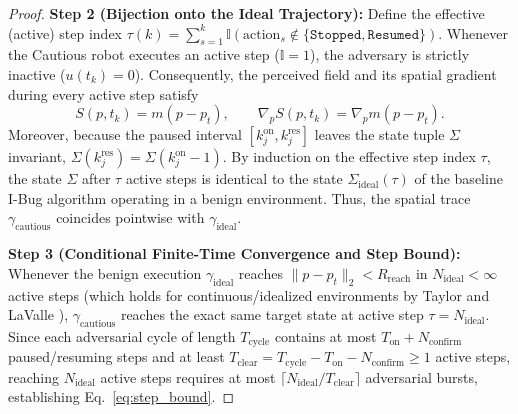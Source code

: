 \documentclass[12pt, a4paper]{article}
\begin{document}
\begin{proof}
\textbf{Step 2 (Bijection onto the Ideal Trajectory):}
Define the effective (active) step index $\tau(k) = \sum_{s=1}^k \mathbb{I}(\text{action}_s \notin \{\texttt{Stopped}, \texttt{Resumed}\})$. Whenever the Cautious robot executes an active step ($\mathbb{I} = 1$), the adversary is strictly inactive ($u(t_k) = 0$). Consequently, the perceived field and its spatial gradient during every active step satisfy
\begin{equation*}
    S(p, t_k) = m(p - p_t), \qquad \nabla_p S(p, t_k) = \nabla_p m(p - p_t).
\end{equation*}
Moreover, because the paused interval $[k_j^{\text{on}}, k_j^{\text{res}}]$ leaves the state tuple $\Sigma$ invariant, $\Sigma(k_j^{\text{res}}) = \Sigma(k_j^{\text{on}} - 1)$. By induction on the effective step index $\tau$, the state $\Sigma$ after $\tau$ active steps is identical to the state $\Sigma_{\text{ideal}}(\tau)$ of the baseline I-Bug algorithm operating in a benign environment. Thus, the spatial trace $\gamma_{\text{cautious}}$ coincides pointwise with $\gamma_{\text{ideal}}$.

\textbf{Step 3 (Conditional Finite-Time Convergence and Step Bound):}
Whenever the benign execution $\gamma_{\text{ideal}}$ reaches $\|p - p_t\|_2 < R_{\text{reach}}$ in $N_{\text{ideal}} < \infty$ active steps (which holds for continuous/idealized environments by Taylor and LaValle \cite{taylor2014intensity}), $\gamma_{\text{cautious}}$ reaches the exact same target state at active step $\tau = N_{\text{ideal}}$. Since each adversarial cycle of length $T_{\text{cycle}}$ contains at most $T_{\text{on}} + N_{\text{confirm}}$ paused/resuming steps and at least $T_{\text{clear}} = T_{\text{cycle}} - T_{\text{on}} - N_{\text{confirm}} \ge 1$ active steps, reaching $N_{\text{ideal}}$ active steps requires at most $\lceil N_{\text{ideal}} / T_{\text{clear}} \rceil$ adversarial bursts, establishing Eq.~\eqref{eq:step_bound}.
\end{proof}
\end{document}
